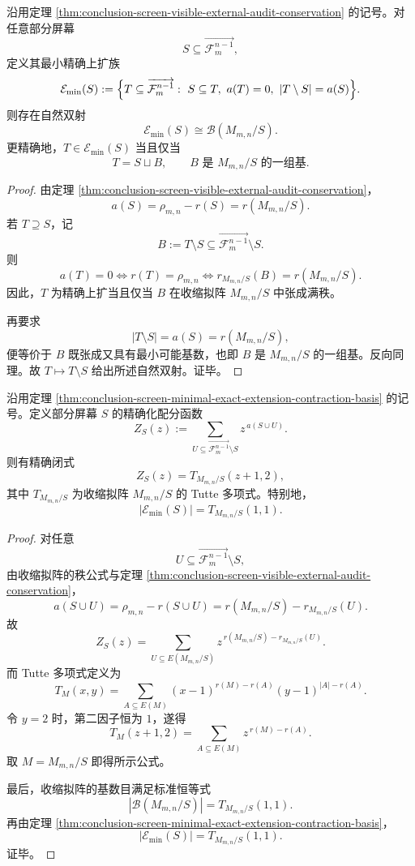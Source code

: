 \begin{theorem}[部分屏幕最小精确上扩的收缩拟阵分类]\label{thm:conclusion-screen-minimal-exact-extension-contraction-basis}
沿用定理 \ref{thm:conclusion-screen-visible-external-audit-conservation} 的记号。对任意部分屏幕
\[
S\subseteq \overrightarrow{\mathcal F_m^{n-1}},
\]
定义其最小精确上扩族
\[
\mathcal E_{\min}(S)
:=
\Bigl\{
T\subseteq \overrightarrow{\mathcal F_m^{n-1}}:\ 
S\subseteq T,\ a(T)=0,\ |T\setminus S|=a(S)
\Bigr\}.
\]
则存在自然双射
\[
\mathcal E_{\min}(S)\cong \mathcal B(M_{m,n}/S).
\]
更精确地，\(T\in \mathcal E_{\min}(S)\) 当且仅当
\[
T=S\sqcup B,
\qquad
B\text{ 是 }M_{m,n}/S\text{ 的一组基}.
\]
\end{theorem}
\begin{proof}
由定理 \ref{thm:conclusion-screen-visible-external-audit-conservation}，
\[
a(S)=\rho_{m,n}-r(S)=r(M_{m,n}/S).
\]
若 \(T\supseteq S\)，记
\[
B:=T\setminus S\subseteq \overrightarrow{\mathcal F_m^{n-1}}\setminus S.
\]
则
\[
a(T)=0
\iff
r(T)=\rho_{m,n}
\iff
r_{M_{m,n}/S}(B)=r(M_{m,n}/S).
\]
因此，\(T\) 为精确上扩当且仅当 \(B\) 在收缩拟阵 \(M_{m,n}/S\) 中张成满秩。

再要求
\[
|T\setminus S|=a(S)=r(M_{m,n}/S),
\]
便等价于 \(B\) 既张成又具有最小可能基数，也即 \(B\) 是 \(M_{m,n}/S\) 的一组基。反向同理。故 \(T\mapsto T\setminus S\) 给出所述自然双射。证毕。
\end{proof}

\begin{theorem}\label{thm:conclusion-screen-deficit-partition-function-tutte-specialization}
沿用定理 \ref{thm:conclusion-screen-minimal-exact-extension-contraction-basis} 的记号。定义部分屏幕 \(S\) 的精确化配分函数
\[
Z_S(z):=
\sum_{U\subseteq \overrightarrow{\mathcal F_m^{n-1}}\setminus S}
z^{\,a(S\cup U)}.
\]
则有精确闭式
\[
Z_S(z)=T_{M_{m,n}/S}(z+1,2),
\]
其中 \(T_{M_{m,n}/S}\) 为收缩拟阵 \(M_{m,n}/S\) 的 Tutte 多项式。特别地，
\[
|\mathcal E_{\min}(S)|=T_{M_{m,n}/S}(1,1).
\]
\end{theorem}
\begin{proof}
对任意
\[
U\subseteq \overrightarrow{\mathcal F_m^{n-1}}\setminus S,
\]
由收缩拟阵的秩公式与定理 \ref{thm:conclusion-screen-visible-external-audit-conservation}，
\[
a(S\cup U)
=
\rho_{m,n}-r(S\cup U)
=
r(M_{m,n}/S)-r_{M_{m,n}/S}(U).
\]
故
\[
Z_S(z)
=
\sum_{U\subseteq E(M_{m,n}/S)}
z^{\,r(M_{m,n}/S)-r_{M_{m,n}/S}(U)}.
\]
而 Tutte 多项式定义为
\[
T_M(x,y)
=
\sum_{A\subseteq E(M)}
(x-1)^{r(M)-r(A)}(y-1)^{|A|-r(A)}.
\]
令 \(y=2\) 时，第二因子恒为 \(1\)，遂得
\[
T_M(z+1,2)=\sum_{A\subseteq E(M)} z^{\,r(M)-r(A)}.
\]
取 \(M=M_{m,n}/S\) 即得所示公式。

最后，收缩拟阵的基数目满足标准恒等式
\[
|\mathcal B(M_{m,n}/S)|=T_{M_{m,n}/S}(1,1).
\]
再由定理 \ref{thm:conclusion-screen-minimal-exact-extension-contraction-basis}，
\[
|\mathcal E_{\min}(S)|=T_{M_{m,n}/S}(1,1).
\]
证毕。
\end{proof}

